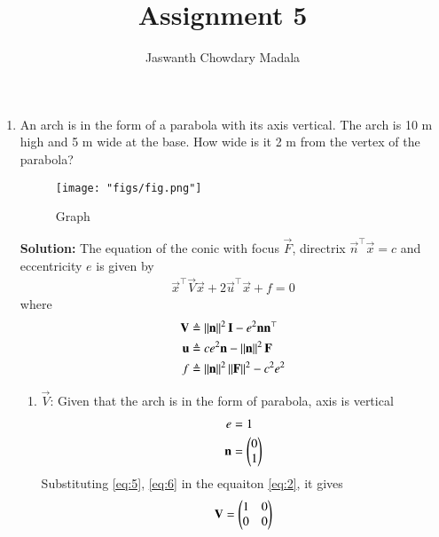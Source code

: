\documentclass[journal,12pt,twocolumn]{IEEEtran}
\begin{document}
\vspace{3cm}


\title{Assignment 5}
\author{Jaswanth Chowdary Madala}


\maketitle

\newpage


\bigskip

\renewcommand{\thefigure}{\theenumi}
\renewcommand{\thetable}{\theenumi}

\begin{enumerate}
\item An arch is in the form of a parabola with its axis vertical. The arch is 10 m high and 5 m wide at the base. How wide is it 2 m from the vertex of the parabola?
\begin{figure}[ht]
\centering
\texttt{[image: "figs/fig.png"]}
\caption{Graph}
\label{fig:1}
\end{figure}

\textbf{Solution:} The equation of the conic with focus $\vec{F}$, directrix $\vec{n}^\top\vec{x} = c$ and eccentricity $e$ is given by
\begin{align}
\vec{x}^\top\vec{V}\vec{x} + 2\vec{u}^\top\vec{x} + f = 0
\label{eq:1}
\end{align}
where
\begin{align}
\mathbf{V} &\triangleq \left\lVert\mathbf{n}\right\rVert^2\mathbf{I} - e^2\mathbf{n}\mathbf{n}^\top \label{eq:2} \\
\mathbf{u} &\triangleq ce^2\mathbf{n} - \left\lVert\mathbf{n}\right\rVert^2\mathbf{F} \label{eq:3} \\
f &\triangleq \left\lVert\mathbf{n}\right\rVert^2\left\lVert\mathbf{F}\right\rVert^2 - c^2e^2 \label{eq:4}
\end{align}
\begin{enumerate}
\item $\vec{V}$: 
Given that the arch is in the form of parabola, axis is vertical 
\begin{align}
e &= 1 \label{eq:5} \\
\mathbf{n} &= \begin{pmatrix}0\\1\end{pmatrix} \label{eq:6}
\end{align}
Substituting \eqref{eq:5}, \eqref{eq:6} in the equaiton \eqref{eq:2}, it gives
\begin{align}
\mathbf{V} = \begin{pmatrix}1&0\\0&0\end{pmatrix}
\end{align}


\end{enumerate}
\end{enumerate}
\end{document}
